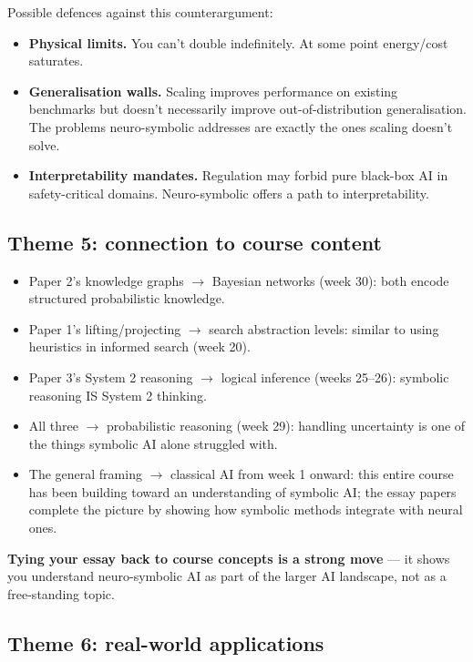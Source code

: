 \documentclass[11pt, a4paper]{article}
\begin{document}
Possible defences against this counterargument:
\begin{itemize}
  \item \textbf{Physical limits.} You can't double indefinitely. At some point energy/cost saturates.
  \item \textbf{Generalisation walls.} Scaling improves performance on existing benchmarks but doesn't necessarily improve out-of-distribution generalisation. The problems neuro-symbolic addresses are exactly the ones scaling doesn't solve.
  \item \textbf{Interpretability mandates.} Regulation may forbid pure black-box AI in safety-critical domains. Neuro-symbolic offers a path to interpretability.
\end{itemize}

\subsection{Theme 5: connection to course content}

\begin{itemize}
  \item Paper 2's knowledge graphs $\to$ Bayesian networks (week 30): both encode structured probabilistic knowledge.
  \item Paper 1's lifting/projecting $\to$ search abstraction levels: similar to using heuristics in informed search (week 20).
  \item Paper 3's System 2 reasoning $\to$ logical inference (weeks 25--26): symbolic reasoning IS System 2 thinking.
  \item All three $\to$ probabilistic reasoning (week 29): handling uncertainty is one of the things symbolic AI alone struggled with.
  \item The general framing $\to$ classical AI from week 1 onward: this entire course has been building toward an understanding of symbolic AI; the essay papers complete the picture by showing how symbolic methods integrate with neural ones.
\end{itemize}

\textbf{Tying your essay back to course concepts is a strong move} — it shows you understand neuro-symbolic AI as part of the larger AI landscape, not as a free-standing topic.

\subsection{Theme 6: real-world applications}
\end{document}

